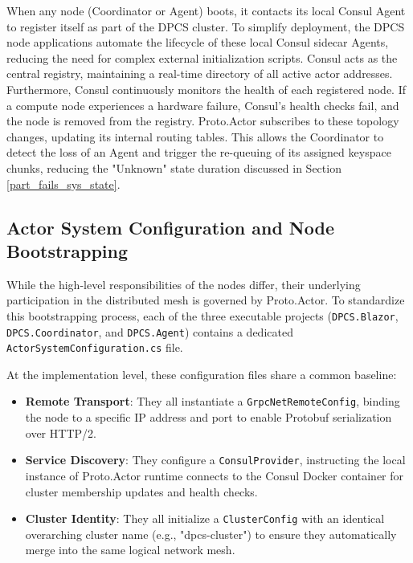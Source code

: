 When any node (Coordinator or Agent) boots, it contacts its local Consul Agent to register itself as part of the DPCS cluster. To simplify deployment, the DPCS node applications automate the lifecycle of these local Consul sidecar Agents, reducing the need for complex external initialization scripts. Consul acts as the central registry, maintaining a real-time directory of all active actor addresses. Furthermore, Consul continuously monitors the health of each registered node. If a compute node experiences a hardware failure, Consul's health checks fail, and the node is removed from the registry. Proto.Actor subscribes to these topology changes, updating its internal routing tables. This allows the Coordinator to detect the loss of an Agent and trigger the re-queuing of its assigned keyspace chunks, reducing the "Unknown" state duration discussed in Section \ref{part_fails_sys_state}.

\subsection{Actor System Configuration and Node Bootstrapping}

While the high-level responsibilities of the nodes differ, their underlying participation in the distributed mesh is governed by Proto.Actor. To standardize this bootstrapping process, each of the three executable projects (\verb|DPCS.Blazor|, \verb|DPCS.Coordinator|, and \verb|DPCS.Agent|) contains a dedicated \verb|ActorSystemConfiguration.cs| file. 

At the implementation level, these configuration files share a common baseline:
\begin{itemize}
    \item \textbf{Remote Transport}: They all instantiate a \verb|GrpcNetRemoteConfig|, binding the node to a specific IP address and port to enable Protobuf serialization over HTTP/2.
    \item \textbf{Service Discovery}: They configure a \verb|ConsulProvider|, instructing the local instance of Proto.Actor runtime connects to the Consul Docker container for cluster membership updates and health checks.
    \item \textbf{Cluster Identity}: They all initialize a \verb|ClusterConfig| with an identical overarching cluster name (e.g., "dpcs-cluster") to ensure they automatically merge into the same logical network mesh.
\end{itemize}

